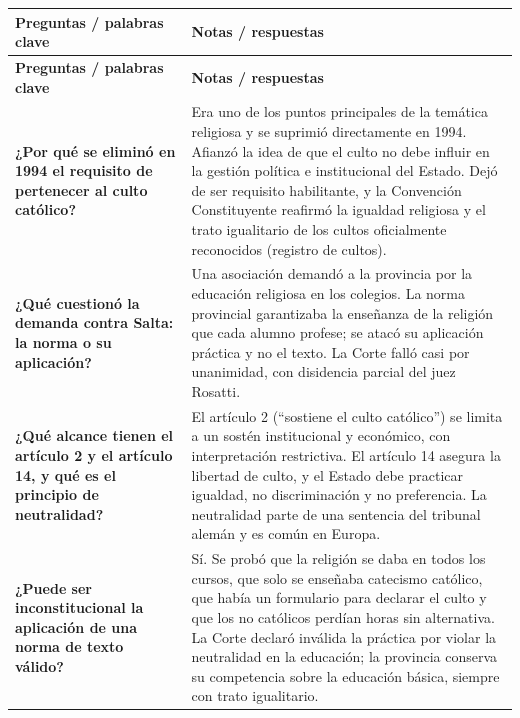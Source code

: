\documentclass[12pt,oneside]{book}
\begin{document}
\begin{longtable}{
    >{\raggedright\arraybackslash}p{}
    !{\vrule width 0.4pt}
    >{\raggedright\arraybackslash}p{\tabcolsep-0.4pt\relax}
}
\toprule
\textbf{Preguntas / palabras clave} & \textbf{Notas / respuestas} \\
\midrule
\endfirsthead
\toprule
\textbf{Preguntas / palabras clave} & \textbf{Notas / respuestas} \\
\midrule
\endhead
\bottomrule
\endfoot
\bottomrule
\endlastfoot

\textbf{¿Por qué se eliminó en 1994 el requisito de pertenecer al culto católico?} &
Era uno de los puntos principales de la temática religiosa y se suprimió directamente en 1994. Afianzó la idea de que el culto no debe influir en la gestión política e institucional del Estado. Dejó de ser requisito habilitante, y la Convención Constituyente reafirmó la igualdad religiosa y el trato igualitario de los cultos oficialmente reconocidos (registro de cultos). \\[0.6em]

\textbf{¿Qué cuestionó la demanda contra Salta: la norma o su aplicación?} &
Una asociación demandó a la provincia por la educación religiosa en los colegios. La norma provincial garantizaba la enseñanza de la religión que cada alumno profese; se atacó su aplicación práctica y no el texto. La Corte falló casi por unanimidad, con disidencia parcial del juez Rosatti. \\[0.6em]

\textbf{¿Qué alcance tienen el artículo 2 y el artículo 14, y qué es el principio de neutralidad?} &
El artículo 2 (``sostiene el culto católico'') se limita a un sostén institucional y económico, con interpretación restrictiva. El artículo 14 asegura la libertad de culto, y el Estado debe practicar igualdad, no discriminación y no preferencia. La neutralidad parte de una sentencia del tribunal alemán y es común en Europa. \\[0.6em]

\textbf{¿Puede ser inconstitucional la aplicación de una norma de texto válido?} &
Sí. Se probó que la religión se daba en todos los cursos, que solo se enseñaba catecismo católico, que había un formulario para declarar el culto y que los no católicos perdían horas sin alternativa. La Corte declaró inválida la práctica por violar la neutralidad en la educación; la provincia conserva su competencia sobre la educación básica, siempre con trato igualitario. \\[0.6em]


\end{longtable}
\end{document}
